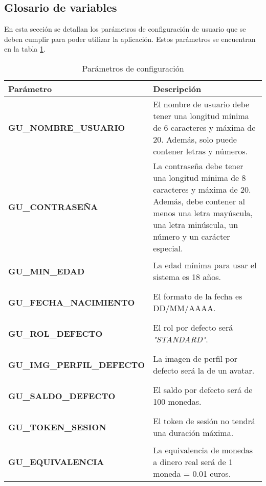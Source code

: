 \subsection{Glosario de variables}\hypertarget{anexo:glosario_variables}{}
En esta sección se detallan los parámetros de configuración de usuario que se deben cumplir para poder utilizar la aplicación. Estos parámetros se encuentran en la tabla \ref{table:variables_requisitos}.
\begin{table}[htb]
    \centering
    \caption{Parámetros de configuración}
    \label{table:variables_requisitos}
    \begin{tabular}{>{\columncolor{lightgreen!20}}p{7cm} p{10cm}}
    \toprule
    \rowcolor{darkgreen!50}
    \textbf{Parámetro} & \textbf{Descripción} \\
    \midrule
    \hypertarget{confParam:gu-nombreUsuario}{}
    \textbf{GU\_NOMBRE\_USUARIO} & El nombre de usuario debe tener una longitud mínima de 6 caracteres y máxima de 20. Además, solo puede contener letras y números.  \\
    \midrule
    \hypertarget{confParam:gu-contrasena}{}
    \textbf{GU\_CONTRASEÑA} & La contraseña debe tener una longitud mínima de 8 caracteres y máxima de 20. Además, debe contener al menos una letra mayúscula, una letra minúscula, un número y un carácter especial. \\
    \midrule
    \hypertarget{confParam:gu-minEdad}{}
    \textbf{GU\_MIN\_EDAD} & La edad mínima para usar el sistema es 18 años. \\
    \midrule
    \hypertarget{confParam:gu-fechaNacimiento}{}
    \textbf{GU\_FECHA\_NACIMIENTO} & El formato  de la fecha es DD/MM/AAAA. \\
    \midrule
    \hypertarget{confParam:gu-rolDefecto}{}
    \textbf{GU\_ROL\_DEFECTO} & El rol por defecto será \textit{"STANDARD"}. \\
    \midrule
    \hypertarget{confParam:gu-imgPerfilDefecto}{}
    \textbf{GU\_IMG\_PERFIL\_DEFECTO} & La imagen de perfil por defecto será la de un avatar.  \\
    \midrule
    \hypertarget{confParam:gu-saldoDefecto}{}
    \textbf{GU\_SALDO\_DEFECTO} & El saldo por defecto será de 100 monedas. \\
    \midrule
    \hypertarget{confParam:gu-tokenSesion}{}
    \textbf{GU\_TOKEN\_SESION} & El token de sesión no tendrá una duración máxima. \\
    \midrule
    \hypertarget{confParam:gu-equivalencia}{}
    \textbf{GU\_EQUIVALENCIA} & La equivalencia de monedas a dinero real será de 1 moneda = 0.01 euros. \\

\end{tabular}
\end{table}
